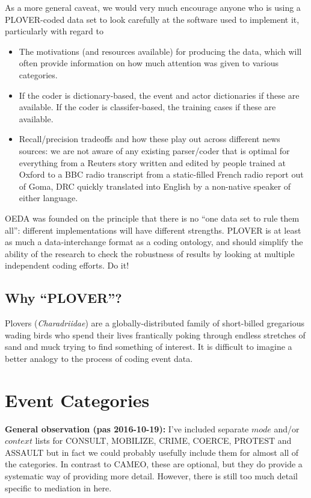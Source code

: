\documentclass[11pt]{report}
\newcommand{\plcat}[1]{\textsf{#1}}
\begin{document}
As a more general caveat, we would very much encourage anyone who is using a PLOVER-coded data set to look carefully at the software used to implement it, particularly with regard to
\begin{itemize}
\item The motivations (and resources available) for producing the data, which will often provide information on how much attention was given to various categories. 
\item If the coder is dictionary-based, the event and actor dictionaries if these are available. If the coder is classifer-based, the training cases if these are available.
\item Recall/precision tradeoffs and how these play out across different news sources: we are not aware of any existing parser/coder that is optimal for everything from a Reuters story written and edited by people trained at Oxford to a BBC radio transcript from a static-filled French radio report out of Goma, DRC quickly translated into English by a non-native speaker of either language.
\end{itemize}

OEDA was founded on the principle that there is no ``one data set to rule them all'': different implementations will have different strengths. PLOVER is at least as much a data-interchange format as a coding ontology, and should simplify the ability of the research to check the robustness of results by looking at multiple independent coding efforts. Do it!



\section{Why ``PLOVER''?}

Plovers (\textit{Charadriidae}) are a globally-distributed family of short-billed gregarious wading birds who spend their lives frantically poking through endless stretches of sand and muck trying to find something of interest. It is difficult to imagine a better analogy to the process of coding event data.


\chapter{Event Categories}

\textbf{General observation (pas 2016-10-19):} I've included separate $mode$ and/or $context$ lists for \plcat{CONSULT, MOBILIZE, CRIME, COERCE, PROTEST} and \plcat{ASSAULT} but in fact we could probably usefully include them for almost all of the categories. In contrast to CAMEO, these are optional, but they do provide a systematic way of providing more detail. However, there is still too much detail specific to mediation in here.
\end{document}
